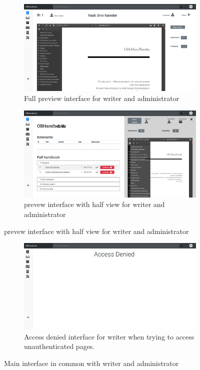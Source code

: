 \begin{figure}[H]\ContinuedFloat
	\centering
	\begin{subfigure}[b]{0.48\textwidth}
		\includegraphics[width=\textwidth]{billeder/iteration3Prototyper/Preview.png}
		\caption{Full preview interface for writer and administrator}
		\label{fig:5-FullPreviewWrite}
	\end{subfigure}
	\quad
	\begin{subfigure}[b]{0.48\textwidth}
		\includegraphics[width=\textwidth]{billeder/iteration3Prototyper/PreviewAdmin.png}
		\caption{prevew interface with half view for writer and administrator}
		\label{fig:5-HalfPreviewWrite}
	\end{subfigure}
\end{figure}
\begin{figure}[H]\ContinuedFloat
	\centering
	\begin{subfigure}[b]{0.48\textwidth}
		\includegraphics[width=\textwidth]{billeder/iteration3Prototyper/AccessDenied.png}
		\caption{Access denied interface for writer when trying to access unauthenticated pages.}
		\label{fig:5-AccessDenied}
	\end{subfigure}
	\caption{Main interface in common with writer and administrator}\label{fig:5-MainWriteAdmin}
\end{figure}

